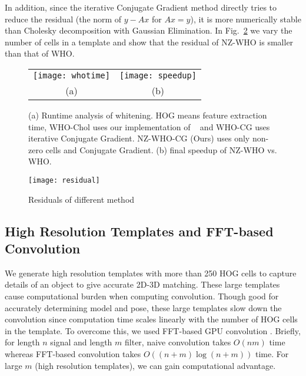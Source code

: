 In addition, since the iterative Conjugate Gradient method directly
tries to reduce the residual (the norm of $y-Ax$ for $Ax = y$), it is
more numerically stable than Cholesky decomposition with Gaussian
Elimination. In Fig.~\ref{fig:whoresidual} we vary the number of cells in a
template and show that the residual of NZ-WHO is smaller than that of WHO.

\begin{figure}[t]
  \begin{center}
  \begin{tabular}{cc}
     \texttt{[image: whotime]} & 
     \texttt{[image: speedup]}\\
     (a) & (b) \\
 \end{tabular}
  \end{center}
  \caption{(a) Runtime analysis of whitening. HOG means feature
    extraction time, WHO-Chol uses our implementation of ~\cite{Hariharan12} and
    WHO-CG uses iterative Conjugate Gradient. NZ-WHO-CG (Ours) uses only
    non-zero cells and Conjugate Gradient. (b) final speedup
    of NZ-WHO vs. WHO.}
  \label{fig:whotime}
\end{figure}
%
\begin{figure}[t]
  \centering
  \texttt{[image: residual]}
  \caption{Residuals of different method}
  \label{fig:whoresidual}
\end{figure}


\subsection{High Resolution Templates and FFT-based Convolution}
\label{sec:fft} 

We generate high resolution templates with more than 250 HOG cells to capture
details of an object to give accurate 2D-3D matching. These large templates
cause computational burden when computing convolution. Though good for
accurately determining model and pose, these large templates slow down the
convolution since computation time scales linearly with the number of HOG cells
in the template. To overcome this, we used FFT-based GPU convolution
\cite{Podlozhnyuk}. Briefly, for length $n$ 
signal and length $m$ filter, naive convolution takes $O(nm)$ time whereas
FFT-based convolution takes $O\left( (n + m)\log (n+m) \right)$ time. For large
$m$ (high resolution templates), we can gain computational advantage.
